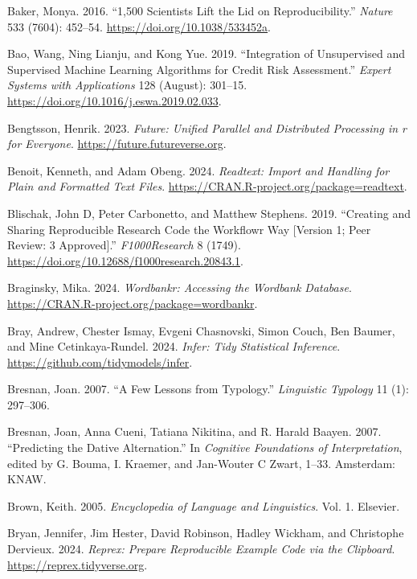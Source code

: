 \documentclass[
  letterpaper,
]{latex/krantz}
\newlength{\cslhangindent}
\newenvironment{CSLReferences}[2] %
 {\begin{list}{}{%
  \setlength{\itemindent}{0pt}
  \setlength{\leftmargin}{0pt}
  \setlength{\parsep}{0pt}
  \ifodd #1
   \setlength{\leftmargin}{\cslhangindent}
   \setlength{\itemindent}{-1\cslhangindent}
  \fi
  \setlength{\itemsep}{#2\baselineskip}}}
 {\end{list}}
\theoremstyle{definition}
\theoremstyle{remark}
\begin{document}
\begin{CSLReferences}{1}{0}
Baker, Monya. 2016. {``1,500 Scientists Lift the Lid on
Reproducibility.''} \emph{Nature} 533 (7604): 452--54.
\url{https://doi.org/10.1038/533452a}.

Bao, Wang, Ning Lianju, and Kong Yue. 2019. {``Integration of
Unsupervised and Supervised Machine Learning Algorithms for Credit Risk
Assessment.''} \emph{Expert Systems with Applications} 128 (August):
301--15. \url{https://doi.org/10.1016/j.eswa.2019.02.033}.

Bengtsson, Henrik. 2023. \emph{Future: Unified Parallel and Distributed
Processing in r for Everyone}. \url{https://future.futureverse.org}.

Benoit, Kenneth, and Adam Obeng. 2024. \emph{Readtext: Import and
Handling for Plain and Formatted Text Files}.
\url{https://CRAN.R-project.org/package=readtext}.

Blischak, John D, Peter Carbonetto, and Matthew Stephens. 2019.
{``Creating and Sharing Reproducible Research Code the Workflowr Way
{[}Version 1; Peer Review: 3 Approved{]}.''} \emph{F1000Research} 8
(1749). \url{https://doi.org/10.12688/f1000research.20843.1}.

Braginsky, Mika. 2024. \emph{Wordbankr: Accessing the Wordbank
Database}. \url{https://CRAN.R-project.org/package=wordbankr}.

Bray, Andrew, Chester Ismay, Evgeni Chasnovski, Simon Couch, Ben Baumer,
and Mine Cetinkaya-Rundel. 2024. \emph{Infer: Tidy Statistical
Inference}. \url{https://github.com/tidymodels/infer}.

Bresnan, Joan. 2007. {``A Few Lessons from Typology.''} \emph{Linguistic
Typology} 11 (1): 297--306.

Bresnan, Joan, Anna Cueni, Tatiana Nikitina, and R. Harald Baayen. 2007.
{``Predicting the Dative Alternation.''} In \emph{Cognitive Foundations
of Interpretation}, edited by G. Bouma, I. Kraemer, and Jan-Wouter C
Zwart, 1--33. Amsterdam: KNAW.

Brown, Keith. 2005. \emph{Encyclopedia of Language and Linguistics}.
Vol. 1. Elsevier.

Bryan, Jennifer, Jim Hester, David Robinson, Hadley Wickham, and
Christophe Dervieux. 2024. \emph{Reprex: Prepare Reproducible Example
Code via the Clipboard}. \url{https://reprex.tidyverse.org}.


\end{CSLReferences}
\end{document}
